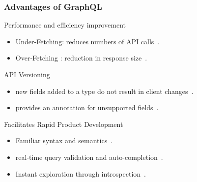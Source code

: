\begin{frame}\frametitle{Advantages of GraphQL}

\begin{block}{Performance and efficiency improvement}
\begin{itemize}
  \item Under-Fetching: reduces  numbers of API calls~\cite{migrating-to-gql}.
  \item Over-Fetching : reduction in response size~\cite{migrating-to-gql}.
\end{itemize}
\end{block}

\begin{block}{API Versioning}
\begin{itemize}
  \item new fields added to a type do not result in client changes~\cite{migrating-to-gql}. 
  \item provides an  annotation for unsupported fields~\cite{migrating-to-gql}. 
\end{itemize}

\end{block}

\begin{block}{Facilitates Rapid Product Development}
\begin{itemize}
  \item  Familiar syntax and semantics~\cite{rest-vs-gql-controlled-experiment}.
  \item real-time query validation and auto-completion~\cite{rest-vs-gql-controlled-experiment,migrating-to-gql}.
  \item Instant exploration through introspection~\cite{migrating-to-gql}. 
\end{itemize}

\end{block}

\end{frame}

